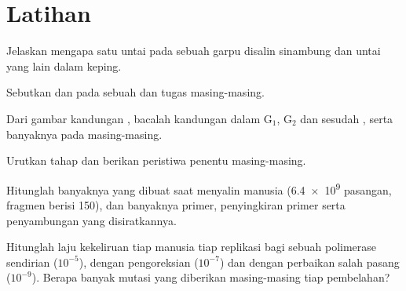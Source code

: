 \section{Latihan}

\begin{exercise}[$\star$]\label{exo:b1:replication-mitosis:1}
Jelaskan mengapa satu untai pada sebuah garpu disalin sinambung dan
untai yang lain dalam keping.
\end{exercise}

\begin{exercise}[$\star$]\label{exo:b1:replication-mitosis:2}
Sebutkan  dan  pada sebuah  dan tugas
masing-masing.
\end{exercise}

\begin{exercise}[$\star$]\label{exo:b1:replication-mitosis:3}
Dari gambar kandungan , bacalah kandungan  dalam G$_1$,
G$_2$ dan sesudah , serta banyaknya  pada masing-masing.
\end{exercise}

\begin{exercise}[$\star$]\label{exo:b1:replication-mitosis:4}
Urutkan tahap  dan berikan peristiwa penentu masing-masing.
\end{exercise}

\begin{exercise}[$\star\star$]\label{exo:b1:replication-mitosis:5}
Hitunglah banyaknya  yang dibuat saat menyalin 
manusia (\num{6.4e9} pasangan, fragmen berisi \qty{150}{}), dan
banyaknya primer, penyingkiran primer serta penyambungan yang
disiratkannya.
\end{exercise}

\begin{exercise}[$\star\star$]\label{exo:b1:replication-mitosis:6}
Hitunglah laju kekeliruan tiap  manusia tiap replikasi bagi
sebuah polimerase sendirian ($10^{-5}$), dengan pengoreksian
($10^{-7}$) dan dengan perbaikan salah pasang ($10^{-9}$). Berapa banyak
mutasi yang diberikan masing-masing tiap pembelahan?
\end{exercise}

